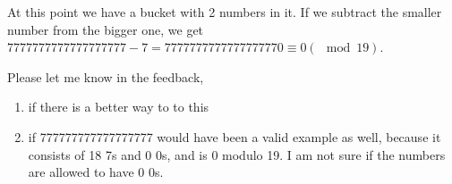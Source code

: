 \documentclass[12pt]{article}
\begin{document}
\begin{enumerate}[a]
	At this point we have a bucket with 2 numbers in it. If we subtract the smaller number from the bigger one, we get $7777777777777777777 - 7 = 7777777777777777770 \equiv 0 (\mod 19)$.

	Please let me know in the feedback,
	\begin{enumerate}
		\item if there is a better way to to this
		\item if 777777777777777777 would have been a valid example as well, because it consists of 18 7s and 0 0s, and is 0 modulo 19. I am not sure if the numbers are allowed to have 0 0s.
	\end{enumerate}
\end{enumerate}
\end{document}
